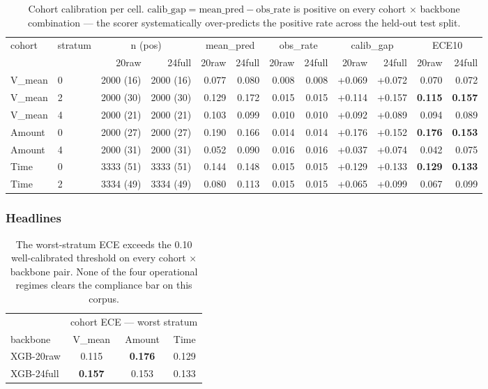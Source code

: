 \documentclass{article}
\begin{document}
\begin{table}[h]
\centering
\small
\begin{tabular}{llrr rrrr rrrr}
\toprule
cohort & stratum & \multicolumn{2}{c}{n (pos)} & \multicolumn{2}{c}{mean\_pred} & \multicolumn{2}{c}{obs\_rate} & \multicolumn{2}{c}{calib\_gap} & \multicolumn{2}{c}{ECE10} \\
\cmidrule(lr){3-4}\cmidrule(lr){5-6}\cmidrule(lr){7-8}\cmidrule(lr){9-10}\cmidrule(lr){11-12}
       &         & 20raw & 24full & 20raw & 24full & 20raw & 24full & 20raw & 24full & 20raw & 24full \\
\midrule
V\_mean & 0 & 2000 (16) & 2000 (16) & 0.077 & 0.080 & 0.008 & 0.008 & +0.069 & +0.072 & 0.070 & 0.072 \\
V\_mean & 2 & 2000 (30) & 2000 (30) & 0.129 & 0.172 & 0.015 & 0.015 & +0.114 & +0.157 & \textbf{0.115} & \textbf{0.157} \\
V\_mean & 4 & 2000 (21) & 2000 (21) & 0.103 & 0.099 & 0.010 & 0.010 & +0.092 & +0.089 & 0.094 & 0.089 \\
Amount & 0  & 2000 (27) & 2000 (27) & 0.190 & 0.166 & 0.014 & 0.014 & +0.176 & +0.152 & \textbf{0.176} & \textbf{0.153} \\
Amount & 4  & 2000 (31) & 2000 (31) & 0.052 & 0.090 & 0.016 & 0.016 & +0.037 & +0.074 & 0.042 & 0.075 \\
Time   & 0  & 3333 (51) & 3333 (51) & 0.144 & 0.148 & 0.015 & 0.015 & +0.129 & +0.133 & \textbf{0.129} & \textbf{0.133} \\
Time   & 2  & 3334 (49) & 3334 (49) & 0.080 & 0.113 & 0.015 & 0.015 & +0.065 & +0.099 & 0.067 & 0.099 \\
\bottomrule
\end{tabular}
\caption{Cohort calibration per cell. $\mathrm{calib\_gap} = \mathrm{mean\_pred} - \mathrm{obs\_rate}$ is positive on every cohort $\times$ backbone combination --- the scorer
systematically over-predicts the positive rate across the held-out test split.}
\label{tab:p8-cohort-calib}
\end{table}

\subsubsection{Headlines}
\begin{table}[h]
\centering
\small
\begin{tabular}{l ccc}
\toprule
& \multicolumn{3}{c}{cohort ECE --- worst stratum} \\
\cmidrule(lr){2-4}
backbone & V\_mean & Amount & Time \\
\midrule
XGB-20raw  & 0.115 & \textbf{0.176} & 0.129 \\
XGB-24full & \textbf{0.157} & 0.153 & 0.133 \\
\bottomrule
\end{tabular}
\caption{The worst-stratum ECE exceeds the 0.10 well-calibrated threshold on every cohort $\times$ backbone pair. None of the four operational regimes clears the compliance bar on this corpus.}
\label{tab:p8-cohort-headlines}
\end{table}
\end{document}
